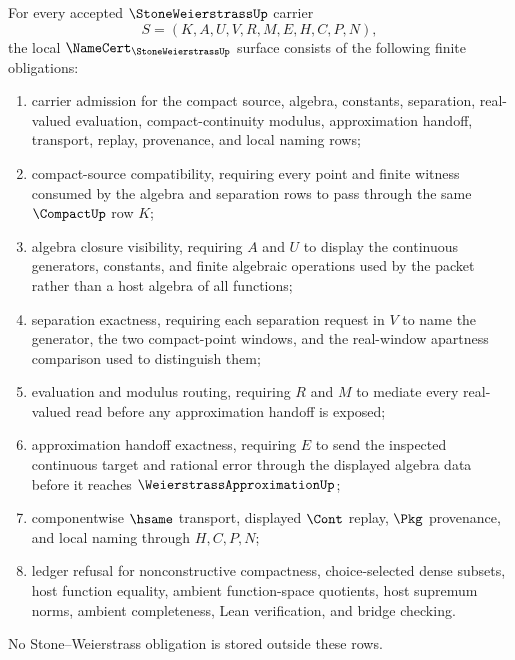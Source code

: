 \begin{theorem}
\label{thm:stone-weierstrass-namecert-obligations}
For every accepted $\StoneWeierstrassUp$ carrier
$$
S=(K,A,U,V,R,M,E,H,C,P,N),
$$
the local $\NameCert_{\StoneWeierstrassUp}$ surface consists of the following finite obligations:
\begin{enumerate}
\item carrier admission for the compact source, algebra, constants, separation, real-valued evaluation, compact-continuity modulus, approximation handoff, transport, replay, provenance, and local naming rows;
\item compact-source compatibility, requiring every point and finite witness consumed by the algebra and separation rows to pass through the same $\CompactUp$ row $K$;
\item algebra closure visibility, requiring $A$ and $U$ to display the continuous generators, constants, and finite algebraic operations used by the packet rather than a host algebra of all functions;
\item separation exactness, requiring each separation request in $V$ to name the generator, the two compact-point windows, and the real-window apartness comparison used to distinguish them;
\item evaluation and modulus routing, requiring $R$ and $M$ to mediate every real-valued read before any approximation handoff is exposed;
\item approximation handoff exactness, requiring $E$ to send the inspected continuous target and rational error through the displayed algebra data before it reaches $\WeierstrassApproximationUp$;
\item componentwise $\hsame$ transport, displayed $\Cont$ replay, $\Pkg$ provenance, and local naming through $H,C,P,N$;
\item ledger refusal for nonconstructive compactness, choice-selected dense subsets, host function equality, ambient function-space quotients, host supremum norms, ambient completeness, Lean verification, and bridge checking.
\end{enumerate}
No Stone--Weierstrass obligation is stored outside these rows.
\end{theorem}
